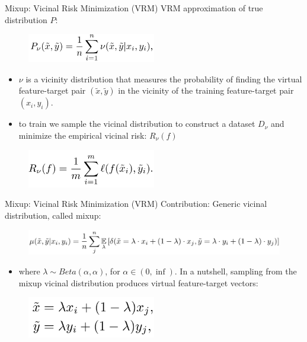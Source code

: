 \documentclass{beamer}
\begin{document}
\begin{frame}{Mixup: Vicinal Risk Minimization (VRM)}
VRM approximation of true distribution $P$:

\begin{figure}[h]
\includegraphics[width=0.5\textwidth]{img/vrm}
\end{figure}

\begin{itemize}
\item $\nu$ is a vicinity distribution that measures the probability of finding the virtual feature-target pair $(\tilde{x}, \tilde{y})$ in the vicinity of the training feature-target pair $(x_i, y_i)$.
\item to train we sample the vicinal distribution to construct a dataset $D_{\nu}$ and minimize the empirical vicinal risk: $R_{\nu}(f)$
\end{itemize}

\begin{figure}[h]
\includegraphics[width=0.5\textwidth]{img/vrl}
\end{figure}

\end{frame}
\begin{frame}{Mixup: Vicinal Risk Minimization (VRM)}
Contribution: Generic vicinal distribution, called mixup:

\begin{figure}[h]
\includegraphics[width=\textwidth]{img/vic_distr}
\end{figure}

\begin{itemize}
\item where $\lambda \sim Beta(\alpha, \alpha)$, for $\alpha \in (0,\inf)$. In a nutshell, sampling from the mixup vicinal distribution produces virtual feature-target vectors:
\end{itemize}

\begin{figure}[h]
\includegraphics[width=0.5\textwidth]{img/sampling}
\end{figure}

\end{frame}
\end{document}
